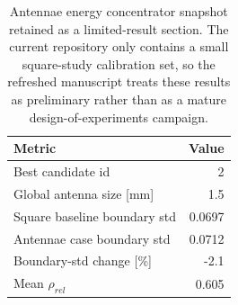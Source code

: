 \begin{table}[tb]
\centering
\caption{Antennae energy concentrator snapshot retained as a limited-result section. The current repository only contains a small square-study calibration set, so the refreshed manuscript treats these results as preliminary rather than as a mature design-of-experiments campaign.}
\label{tab:antennae_refresh}
\small
\begin{tabular}{lr}
\toprule
Metric & Value \\
\midrule
Best candidate id & 2 \\
Global antenna size [mm] & 1.5 \\
Square baseline boundary std & 0.0697 \\
Antennae case boundary std & 0.0712 \\
Boundary-std change [\%] & -2.1 \\
Mean $\rho_{rel}$ & 0.605 \\
\bottomrule
\end{tabular}
\end{table}